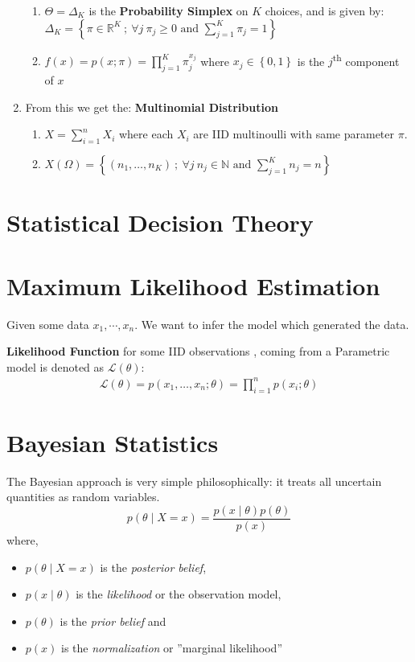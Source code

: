 \documentclass[a4paper,portrait,columns=2, hidelinks]{cheatsheet}
\begin{document}
\begin{enumerate}
\begin{enumerate}
		\item  $\Theta = \Delta_{K}$ is the \textbf{Probability Simplex} on $K$ choices, and is given by: \(\Delta_{K} = \left\{\pi \in \mathbb{R}^{K}\ ;\ \forall j\ \pi_{j} \geq 0 \text{ and } \sum_{j=1}^{K}\pi_{j} = 1\right\}\)
		\item \(f(x) = p(x;\pi) = \prod_{j=1}^{K}\pi_{j}^{x_{j}}\) where \(x_{j} \in \left\{0,1\right\}\) is the $j$\textsuperscript{th} component of $x$
	\end{enumerate}
	\item From this we get the: \textbf{Multinomial Distribution}
	\begin{enumerate}
		\item \(X = \sum_{i=1}^{n}X_{i}\) where each \(X_i\) are IID multinoulli with same parameter \(\pi\).
		\item \(X(\Omega) = \left\{(n_{1},\ldots,n_{K})\ ;\ \forall j\ n_{j} \in \mathbb{N} \text{ and } \sum_{j=1}^{K}n_{j} = n\right\}\)
	\end{enumerate}
\end{enumerate}

\section{Statistical Decision Theory}

\section{Maximum Likelihood Estimation}
Given some data $x_1, \cdots, x_n$. We want to infer the model which generated the data.

\textbf{Likelihood Function} for some IID observations , coming from a Parametric model is denoted as $\mathcal{L}(\theta)$:
\begin{align*}
\mathcal{L}(\theta) = p(x_{1},\ldots,x_{n};\theta) = \prod_{i=1}^{n}p(x_{i};\theta)
\end{align*}

\section{Bayesian Statistics}

The Bayesian approach is very simple philosophically: it treats all uncertain quantities as random variables.
$$ p(\theta \mid X = x) = \frac{p(x \mid \theta) p(\theta)}{p(x)} $$
where,
\begin{itemize}
	\item[] $ p(\theta \mid X = x) $ is the \emph{posterior belief}, 
	\item[] $ p(x \mid \theta) $ is the \emph{likelihood} or the observation model, 
	\item[] $ p(\theta) $ is the \emph{prior belief} and 
	\item[] $ p(x) $ is the \emph{normalization} or ''marginal likelihood''
\end{itemize}
\end{document}
